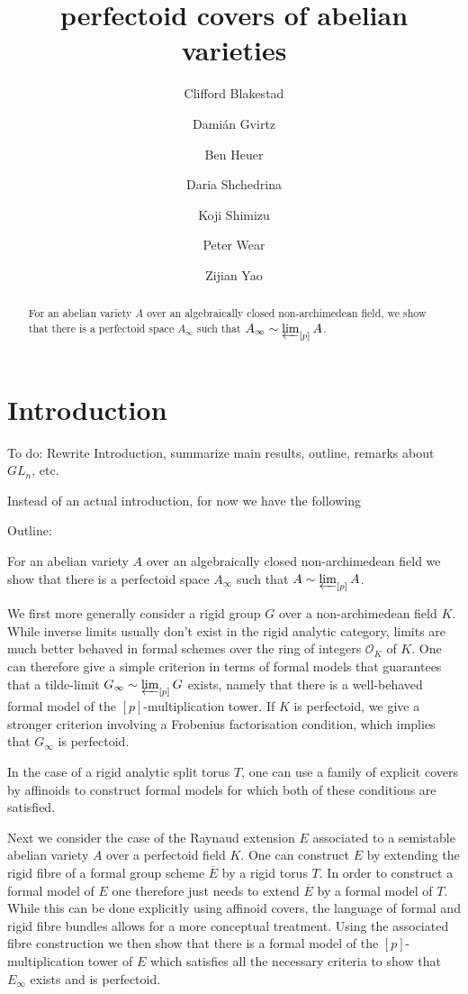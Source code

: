 \documentclass[10pt,oneside]{amsart}
\title[perfectoid covers of abelian varieties]{perfectoid  covers of abelian varieties}
\author{
	Clifford Blakestad \and
	Dami\'an Gvirtz \and
	Ben Heuer \and 
	Daria Shchedrina \and
	Koji Shimizu \and 
	Peter Wear \and
	Zijian Yao}
\theoremstyle{definition}
\theoremstyle{remark}
\begin{document}
	
	\maketitle
	
	\begin{abstract}
For an abelian variety $A$ over an algebraically closed non-archimedean field, we show that there is a perfectoid space $A_\infty$ such that $A_{\infty}\sim\varprojlim_{[p]}A$. 
	\end{abstract}
	
	
	\tableofcontents
	
\newpage 
	
	\section{Introduction}
{\color{red} To do: Rewrite Introduction, summarize main results, outline, remarks about $GL_n$, etc.
	
Instead of an actual introduction, for now we have the following}

{\color{blue} Outline:} 

For an abelian variety $A$ over an algebraically closed non-archimedean field we show that there is a perfectoid space $A_\infty$ such that $A\sim\varprojlim_{[p]}A$. 

We first more generally consider a rigid group  $G$ over a non-archimedean field $K$. While inverse limits usually don't exist in the rigid analytic category, limits are much better behaved in formal schemes over the ring of integers $\mathcal O_K$ of $K$. One can therefore give a simple criterion in terms of formal models that guarantees that a tilde-limit $G_\infty \sim\varprojlim_{[p]} G$ exists, namely that there is a well-behaved formal model of the $[p]$-multiplication tower.
If $K$ is perfectoid, we give a stronger criterion involving a Frobenius factorisation condition, which implies that $G_\infty$ is perfectoid.

In the case of a rigid analytic split torus $T$, one can use a family of explicit covers by affinoids to construct formal models for which both of these conditions are satisfied. 

Next we consider the case of the Raynaud extension $E$ associated to a semistable abelian variety $A$ over a perfectoid field $K$. One can construct $E$ by extending the rigid fibre of a formal group scheme $\overline{E}$ by a rigid torus $T$. In order to construct a formal model of $E$ one therefore just needs to extend $\overline{E}$ by a formal model of $T$. While this can be done explicitly using affinoid covers, the language of formal and rigid fibre bundles allows for a more conceptual treatment. Using the associated fibre construction we then show that there is a formal model of the $[p]$-multiplication tower of $E$ which satisfies all the necessary criteria to show that $E_\infty$ exists and is perfectoid.  
\end{document}
